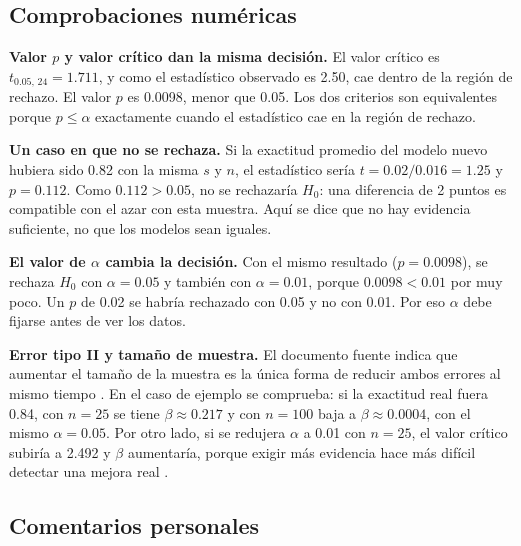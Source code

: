\documentclass[11pt,letterpaper]{article}
\begin{document}
\subsection{Comprobaciones numéricas}

\textbf{Valor $p$ y valor crítico dan la misma decisión.} El valor crítico es $t_{0.05,\,24} = 1.711$, y como el estadístico observado es 2.50, cae dentro de la región de rechazo. El valor $p$ es 0.0098, menor que 0.05. Los dos criterios son equivalentes porque $p \le \alpha$ exactamente cuando el estadístico cae en la región de rechazo.

\textbf{Un caso en que no se rechaza.} Si la exactitud promedio del modelo nuevo hubiera sido 0.82 con la misma $s$ y $n$, el estadístico sería $t = 0.02/0.016 = 1.25$ y $p = 0.112$. Como $0.112 > 0.05$, no se rechazaría $H_0$: una diferencia de 2 puntos es compatible con el azar con esta muestra. Aquí se dice que no hay evidencia suficiente, no que los modelos sean iguales.

\textbf{El valor de $\alpha$ cambia la decisión.} Con el mismo resultado ($p = 0.0098$), se rechaza $H_0$ con $\alpha = 0.05$ y también con $\alpha = 0.01$, porque $0.0098 < 0.01$ por muy poco. Un $p$ de 0.02 se habría rechazado con 0.05 y no con 0.01. Por eso $\alpha$ debe fijarse antes de ver los datos.

\textbf{Error tipo II y tamaño de muestra.} El documento fuente indica que aumentar el tamaño de la muestra es la única forma de reducir ambos errores al mismo tiempo \parencite{tecnm2026_documento_fuente}. En el caso de ejemplo se comprueba: si la exactitud real fuera 0.84, con $n = 25$ se tiene $\beta \approx 0.217$ y con $n = 100$ baja a $\beta \approx 0.0004$, con el mismo $\alpha = 0.05$. Por otro lado, si se redujera $\alpha$ a 0.01 con $n = 25$, el valor crítico subiría a 2.492 y $\beta$ aumentaría, porque exigir más evidencia hace más difícil detectar una mejora real \parencite{tecnm2026_documento_fuente}.

\subsection{Comentarios personales}
\end{document}
